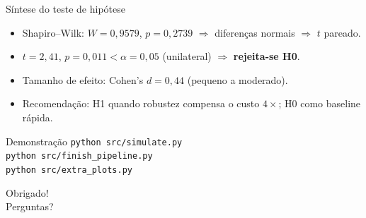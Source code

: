 \documentclass[aspectratio=169,10pt]{beamer}
\begin{document}
\begin{frame}{Síntese do teste de hipótese}
  \begin{itemize}
    \item Shapiro--Wilk: $W=0{,}9579$, $p=0{,}2739$ $\Rightarrow$ diferenças normais $\Rightarrow$ $t$ pareado.
    \item $t=2{,}41$, $p=0{,}011 < \alpha=0{,}05$ (unilateral) $\Rightarrow$ \textbf{rejeita-se H0}.
    \item Tamanho de efeito: Cohen's $d=0{,}44$ (pequeno a moderado).
    \item Recomendação: H1 quando robustez compensa o custo $4\times$; H0 como baseline rápida.
  \end{itemize}
\end{frame}

\begin{frame}{Demonstração}
  \texttt{python src/simulate.py}\\
  \texttt{python src/finish\_pipeline.py}\\
  \texttt{python src/extra\_plots.py}
\end{frame}

\begin{frame}
  \centering
  \Large Obrigado!\\
  \normalsize Perguntas?
\end{frame}
\end{document}
